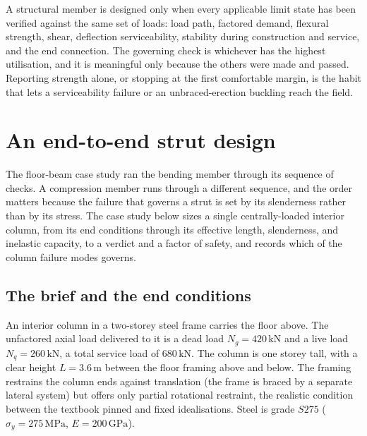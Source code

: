 \begin{principle}
A structural member is designed only when every applicable limit state
has been verified against the same set of loads: load path, factored
demand, flexural strength, shear, deflection serviceability, stability
during construction and service, and the end connection. The governing
check is whichever has the highest utilisation, and it is meaningful
only because the others were made and passed. Reporting strength alone,
or stopping at the first comfortable margin, is the habit that lets a
serviceability failure or an unbraced-erection buckling reach the field.
\end{principle}

\section{An end-to-end strut design}

The floor-beam case study ran the bending member through its sequence of
checks. A compression member runs through a different sequence, and the
order matters because the failure that governs a strut is set by its
slenderness rather than by its stress. The case study below sizes a
single centrally-loaded interior column, from its end conditions through
its effective length, slenderness, and inelastic capacity, to a verdict
and a factor of safety, and records which of the column failure modes
governs.

\subsection{The brief and the end conditions}

An interior column in a two-storey steel frame carries the floor above.
The unfactored axial load delivered to it is a dead load $N_g =
420\,\text{kN}$ and a live load $N_q = 260\,\text{kN}$, a total service
load of $680\,\text{kN}$. The column is one storey tall, with a
clear height $L = 3.6\,\si{\meter}$ between the floor framing above and
below. The framing restrains the column ends against translation (the
frame is braced by a separate lateral system) but offers only partial
rotational restraint, the realistic condition between the textbook
pinned and fixed idealisations. Steel is grade $S275$ ($\sigma_y =
275\,\text{MPa}$, $E = 200\,\text{GPa}$).

